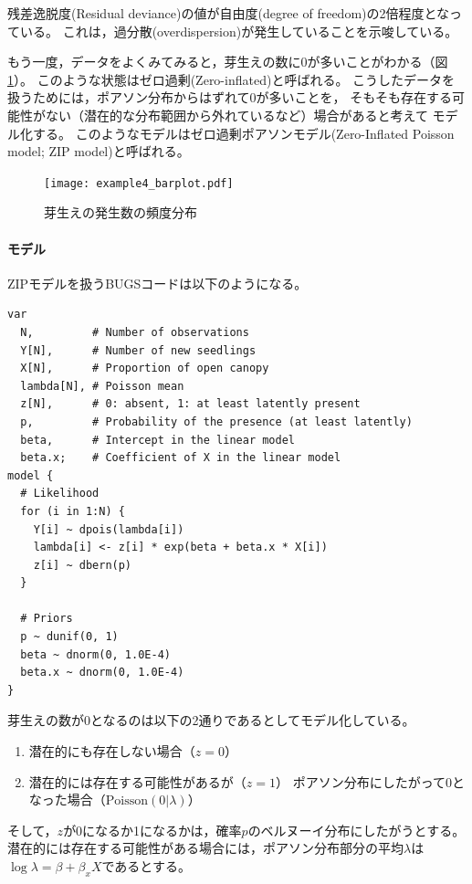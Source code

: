 \documentclass[11pt,uplatex]{jsarticle}
\begin{document}
残差逸脱度(Residual deviance)の値が自由度(degree of freedom)の2倍程度となっている。
これは，過分散(overdispersion)が発生していることを示唆している。

もう一度，データをよくみてみると，芽生えの数に0が多いことがわかる（図\ref{example4_barplot}）。
このような状態はゼロ過剰(Zero-inflated)と呼ばれる。
こうしたデータを扱うためには，ポアソン分布からはずれて0が多いことを，
そもそも存在する可能性がない（潜在的な分布範囲から外れているなど）場合があると考えて
モデル化する。
このようなモデルはゼロ過剰ポアソンモデル(Zero-Inflated Poisson model; ZIP model)と呼ばれる。

\begin{figure}[hbtp]
  \begin{center}
    \texttt{[image: example4\_barplot.pdf]}
  \end{center}
  \caption{芽生えの発生数の頻度分布}
  \label{example4_barplot}
\end{figure}


\paragraph{モデル}
ZIPモデルを扱うBUGSコードは以下のようになる。

\begin{lstlisting}
var
  N,         # Number of observations
  Y[N],      # Number of new seedlings
  X[N],      # Proportion of open canopy
  lambda[N], # Poisson mean
  z[N],      # 0: absent, 1: at least latently present
  p,         # Probability of the presence (at least latently)
  beta,      # Intercept in the linear model
  beta.x;    # Coefficient of X in the linear model
model {
  # Likelihood
  for (i in 1:N) {
    Y[i] ~ dpois(lambda[i])
    lambda[i] <- z[i] * exp(beta + beta.x * X[i])
    z[i] ~ dbern(p)
  }

  # Priors
  p ~ dunif(0, 1)
  beta ~ dnorm(0, 1.0E-4)
  beta.x ~ dnorm(0, 1.0E-4)
}
\end{lstlisting}


芽生えの数が0となるのは以下の2通りであるとしてモデル化している。
\begin{enumerate}
\item 潜在的にも存在しない場合（$z=0$）
\item 潜在的には存在する可能性があるが（$z=1$）
ポアソン分布にしたがって0となった場合（$\mathrm{Poisson}(0|\lambda)$）
\end{enumerate}
そして，$z$が0になるか1になるかは，確率$p$のベルヌーイ分布にしたがうとする。
潜在的には存在する可能性がある場合には，ポアソン分布部分の平均$\lambda$は
$\log\lambda = \beta + \beta_{x}X$であるとする。
\end{document}
